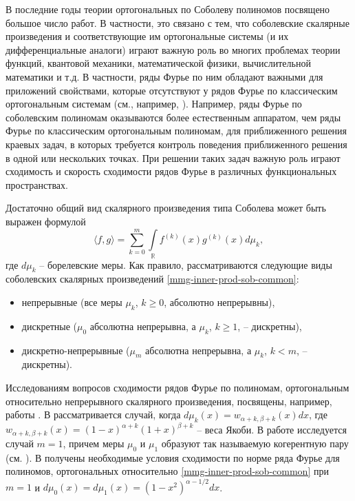 \Introduction

В последние годы теории ортогональных по Соболеву полиномов посвящено большое число работ. В частности, это связано с тем, что соболевские скалярные произведения и соответствующие им ортогональные системы (и их дифференциальные аналоги) играют важную роль во многих проблемах теории функций, квантовой механики, математической физики, вычислительной математики и т.д. В частности, ряды Фурье по ним обладают важными для приложений свойствами, которые отсутствуют у рядов Фурье по классическим ортогональным системам (см., например, \cite{Ram-Ba-Ra-Pe,Ram-Mar-Xu,Ram-Shar-UMN}).
Например, ряды Фурье по соболевским полиномам оказываются более естественным аппаратом, чем ряды Фурье по классическим ортогональным полиномам, для приближенного решения краевых задач, в которых требуется контроль поведения приближенного решения в одной или нескольких точках.
При решении таких задач важную роль играют сходимость и скорость сходимости рядов Фурье в различных функциональных пространствах.

Достаточно общий вид скалярного произведения типа Соболева может быть выражен формулой
\begin{equation}\label{mmg-inner-prod-sob-common}
	\langle f,g \rangle = \sum_{k=0}^{m}\int\limits_{\mathbb{R}}f^{(k)}(x)g^{(k)}(x)d\mu_k,
\end{equation}
где $d\mu_k$ -- борелевские меры.
Как правило, рассматриваются следующие виды соболевских скалярных произведений \eqref{mmg-inner-prod-sob-common}:
\begin{itemize}
	\item
	непрерывные (все меры $\mu_k$, $k \ge 0$, абсолютно непрерывны),
	\item
	дискретные ($\mu_0$ абсолютна непрерывна, а $\mu_k$, $k \ge 1$, -- дискретны),
	\item
	дискретно-непрерывные ($\mu_m$ абсолютна непрерывна, а $\mu_k$, $k < m$, -- дискретны).	
\end{itemize}

Исследованиям вопросов сходимости рядов Фурье по полиномам, ортогональным относительно непрерывного скалярного произведения, посвящены, например, работы \cite{mmg-MarcellanJacobiSobolev,mmg-CiaurriJacobiSobolev,mmg-CiaurriCoherentPairs,mmg-Fejzullahu2010,mmg-Fejzullahu2013}. В \cite{mmg-MarcellanJacobiSobolev,mmg-CiaurriJacobiSobolev} рассматривается случай, когда $d\mu_k(x)=w_{\alpha+k,\beta+k}(x)dx$, где $w_{\alpha+k,\beta+k}(x)=(1-x)^{\alpha+k}(1+x)^{\beta+k}$ -- веса Якоби. В работе \cite{mmg-CiaurriCoherentPairs} исследуется случай $m=1$, причем меры $\mu_0$ и $\mu_1$ образуют так называемую когерентную пару (см. \cite{mmg-IserlesKoch1991,mmg-MarcellanXu2015}). В \cite{mmg-Fejzullahu2010} получены необходимые условия сходимости по норме ряда Фурье для полиномов, ортогональных относительно \eqref{mmg-inner-prod-sob-common} при $m=1$ и $d\mu_0(x)=d\mu_1(x)=(1-x^2)^{\alpha-1/2}dx$.

